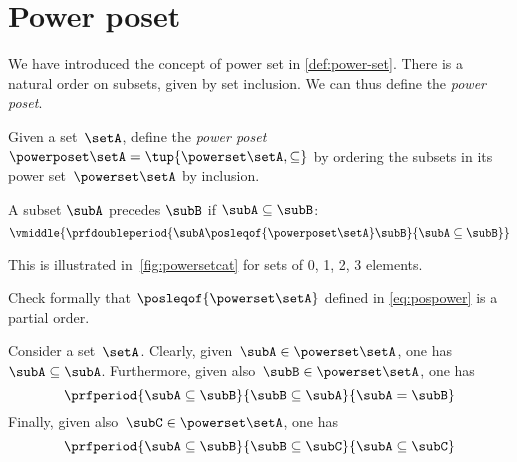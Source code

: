 \section{Power poset}

We have introduced the concept of power set in \cref{def:power-set}.
There is a natural order on subsets, given by set inclusion.
We can thus define the \emph{power poset}.

\begin{definition}
	\label{def:power-poset}
	Given a set~$\setA$,
	define the \emph{power poset} $\powerposet\setA = \tup{\powerset\setA,\subseteq}$ by ordering the subsets in its power set~$\powerset\setA$ by inclusion.

	A subset $\subA$ precedes $\subB$ if $\subA \subseteq \subB$:
	\begin{equation}\label{eq:pospower}
		\vmiddle{
			\prfdoubleperiod{
				\subA \posleqof{\powerposet\setA} \subB
			}{
				\subA \subseteq \subB
			}
		}
	\end{equation}
\end{definition}
This is illustrated in~\cref{fig:powersetcat} for sets of 0, 1, 2, 3 elements.
\begin{exercise}
	Check formally that $\posleqof{\powerset\setA}$ defined in \cref{eq:pospower} is a partial order.
\end{exercise}
\begin{solution}
	Consider a set~$\setA$.
	Clearly, given~$\subA\in \powerset \setA$, one has~$\subA\subseteq \subA$.
	Furthermore, given also~$\subB\in \powerset \setA$, one has
	\begin{equation*}
		\prfperiod{\subA\subseteq \subB}{\subB\subseteq \subA}{\subA=\subB}
	\end{equation*}
	Finally, given also~$\subC\in \powerset \setA$, one has
	\begin{equation*}
		\prfperiod{\subA\subseteq \subB}{\subB\subseteq \subC}{\subA\subseteq\subC}
	\end{equation*}
\end{solution}
\vfill
\begin{figure*}[h]
	\centering
	\hfill
	\hfill
	\hfill
	\caption{Power set as a poset.
	}
	\label{fig:powersetcat}
\end{figure*}\
\vfill

